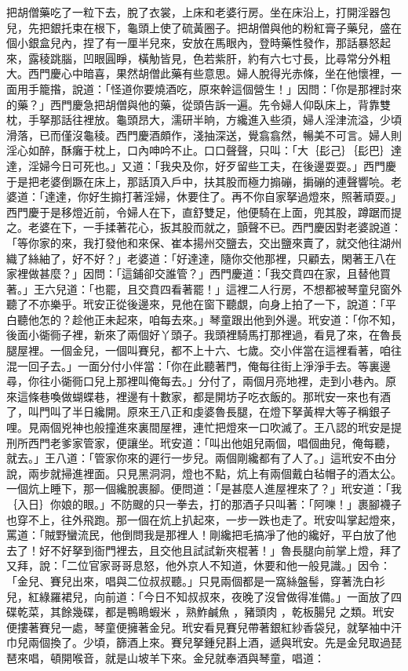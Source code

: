 把胡僧藥吃了一粒下去，脫了衣裳，上床和老婆行房。坐在床沿上，打開淫器包兒，先把銀托束在根下，龜頭上使了硫黃圈子。把胡僧與他的粉紅膏子藥兒，盛在個小銀盒兒內，捏了有一厘半兒來，安放在馬眼內，登時藥性發作，那話暴怒起來，露稜跳腦，凹眼圓睜，橫觔皆見，色若紫肝，約有六七寸長，比尋常分外粗大。西門慶心中暗喜，果然胡僧此藥有些意思。婦人脫得光赤條，坐在他懷裡，一面用手籠揝，說道：「怪道你要燒酒吃，原來幹這個營生！」因問：「你是那裡討來的藥？」西門慶急把胡僧與他的藥，從頭告訴一遍。先令婦人仰臥床上，背靠雙枕，手拏那話往裡放。龜頭昂大，濡研半晌，方纔進入些須，婦人淫津流溢，少頃滑落，已而僅沒龜稜。西門慶酒頗作，淺抽深送，覺翕翕然，暢美不可言。婦人則淫心如醉，酥癱于枕上，口內呻吟不止。口口聲聲，只叫：「大｛髟己｝｛髟巴｝達達，淫婦今日可死也。」又道：「我央及你，好歹留些工夫，在後邊耍耍。」西門慶于是把老婆倒蹶在床上，那話頂入戶中，扶其股而極力搧磞，掮磞的連聲響喨。老婆道：「達達，你好生搧打著淫婦，休要住了。再不你自家拏過燈來，照著頑耍。」西門慶于是移燈近前，令婦人在下，直舒雙足，他便騎在上面，兜其股，蹲踞而提之。老婆在下，一手揉著花心，扳其股而就之，顫聲不已。西門慶因對老婆說道：「等你家的來，我打發他和來保、崔本揚州交鹽去，交出鹽來賣了，就交他往湖州織了絲紬了，好不好？」老婆道：「好達達，隨你交他那裡，只顧去，閑著王八在家裡做甚麼？」因問：「這鋪卻交誰管？」西門慶道：「我交賁四在家，且替他買著。」王六兒道：「也罷，且交賁四看著罷！」這裡二人行房，不想都被琴童兒窗外聽了不亦樂乎。玳安正從後邊來，見他在窗下聽覷，向身上拍了一下，說道：「平白聽他怎的？趁他正未起來，咱每去來。」琴童跟出他到外邊。玳安道：「你不知，後面小衚衕子裡，新來了兩個好丫頭子。我頭裡騎馬打那裡過，看見了來，在魯長腿屋裡。一個金兒，一個叫賽兒，都不上十六、七歲。交小伴當在這裡看著，咱往混一回子去。」一面分付小伴當：「你在此聽著門，俺每往街上淨淨手去。等裏邊尋，你往小衚衕口兒上那裡叫俺每去。」分付了，兩個月亮地裡，走到小巷內。原來這條巷喚做蝴蝶巷，裡邊有十數家，都是開坊子吃衣飯的。那玳安一來也有酒了，叫門叫了半日纔開。原來王八正和虔婆魯長腿，在燈下拏黃桿大等子稱銀子哩。見兩個兇神也般撞進來裏間屋裡，連忙把燈來一口吹滅了。王八認的玳安是提刑所西門老爹家管家，便讓坐。玳安道：「叫出他姐兒兩個，唱個曲兒，俺每聽，就去。」王八道：「管家你來的遲行一步兒。兩個剛纔都有了人了。」這玳安不由分說，兩步就掃進裡面。只見黑洞洞，燈也不點，炕上有兩個戴白毡帽子的酒太公。一個炕上睡下，那一個纔脫裹腳。便問道：「是甚麼人進屋裡來了？」玳安道：「我｛入日｝你娘的眼。」不防颼的只一拳去，打的那酒子只叫著：「阿嚛！」裹腳襪子也穿不上，往外飛跑。那一個在炕上扒起來，一步一跌也走了。玳安叫掌起燈來，罵道：「賊野蠻流民，他倒問我是那裡人！剛纔把毛搞凈了他的纔好，平白放了他去了！好不好拏到衙門裡去，且交他且試試新夾棍著！」魯長腿向前掌上燈，拜了又拜，說：「二位官家哥哥息怒，他外京人不知道，休要和他一般見識。」因令：「金兒、賽兒出來，唱與二位叔叔聽。」只見兩個都是一窩絲盤髻，穿著洗白衫兒，紅綠羅裙兒，向前道：「今日不知叔叔來，夜晚了沒曾做得准備。」一面放了四碟乾菜，其餘幾碟，都是鴨瞗蝦米 ，熟鮓鹹魚 ，豬頭肉 ，乾板腸兒 之類。玳安便摟著賽兒一處，琴童便擁著金兒。玳安看見賽兒帶著銀紅紗香袋兒，就拏袖中汗巾兒兩個換了。少頃，篩酒上來。賽兒拏鍾兒斟上酒，遞與玳安。先是金兒取過琵琶來唱，頓開喉音，就是山坡羊下來。金兒就奉酒與琴童，唱道：

